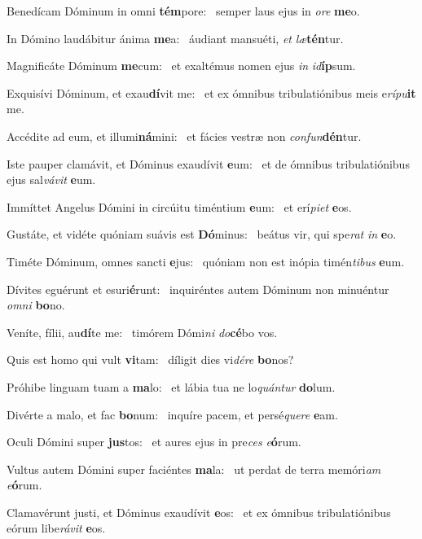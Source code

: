 \item Benedícam Dóminum in omni \textbf{tém}pore:~\psstar{} semper laus ejus in \textit{ore} \textbf{me}o.
\item In Dómino laudábitur ánima \textbf{me}a:~\psstar{} áudiant mansuéti, \textit{et} \textit{læ}\textbf{tén}tur.
\item Magnificáte Dóminum \textbf{me}\-cum:~\psstar{} et exaltémus nomen ejus \textit{in} \textit{id}\textbf{íp}sum.
\item Exquisívi Dóminum, et exau\textbf{dí}vit me:~\psstar{} et ex ómnibus tribulatiónibus meis e\textit{rípu}\textbf{it} me.
\item Accédite ad eum, et illumi\textbf{ná}mini:~\psstar{} et fácies vestræ non \textit{confun}\textbf{dén}tur.
\item Iste pauper clamávit, et Dóminus exaudívit \textbf{e}um:~\psstar{} et de ómnibus tribulatiónibus ejus sal\textit{vávit} \textbf{e}um.
\item Immíttet Angelus Dómini in circúitu timéntium \textbf{e}um:~\psstar{} et erí\textit{piet} \textbf{e}os.
\item Gustáte, et vidéte quóniam suávis est \textbf{Dó}minus:~\psstar{} beátus vir, qui spe\textit{rat} \textit{in} \textbf{e}o.
\item Timéte Dóminum, omnes sancti \textbf{e}jus:~\psstar{} quóniam non est inópia timén\textit{tibus} \textbf{e}um.
\item Dívites eguérunt et esuri\textbf{é}\-runt:~\psstar{} inquiréntes autem Dóminum non minuéntur \textit{omni} \textbf{bo}no.
\item Veníte, fílii, au\textbf{dí}te me:~\psstar{} timórem Dómi\textit{ni} \textit{do}\textbf{cé}bo vos.
\item Quis est homo qui vult \textbf{vi}tam:~\psstar{} díligit dies vi\textit{dére} \textbf{bo}nos?
\item Próhibe linguam tuam a \textbf{ma}lo:~\psstar{} et lábia tua ne lo\textit{quántur} \textbf{do}lum.
\item Divérte a malo, et fac \textbf{bo}num:~\psstar{} inquíre pacem, et persé\textit{quere} \textbf{e}am.
\item Oculi Dómini super \textbf{jus}tos:~\psstar{} et aures ejus in pre\textit{ces} \textit{e}\textbf{ó}rum.
\item Vultus autem Dómini super faciéntes \textbf{ma}la:~\psstar{} ut perdat de terra memóri\textit{am} \textit{e}\textbf{ó}rum.
\item Clamavérunt justi, et Dóminus exaudívit \textbf{e}os:~\psstar{} et ex ómnibus tribulatiónibus eórum libe\textit{rávit} \textbf{e}os.
